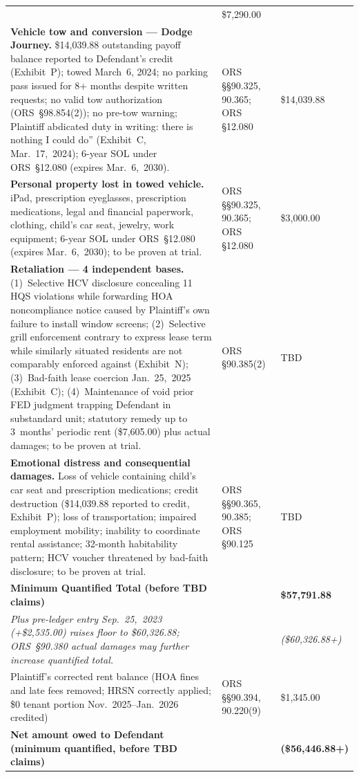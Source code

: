 \documentclass[10pt,letterpaper,oneside]{extarticle}
\begin{document}
\begin{longtable}{p{3.3in} p{1.6in} p{.7in}}
	& \$7,290.00 \\[12pt]
	\textbf{Vehicle tow and conversion --- Dodge
		Journey.} \$14,039.88 outstanding payoff balance
	reported to Defendant's credit (Exhibit~P); towed
	March~6, 2024; no parking pass issued for 8+
	months despite written requests; no valid tow
	authorization (ORS~\S98.854(2)); no pre-tow
	warning; Plaintiff abdicated duty in writing:
	there is nothing I could do''
	(Exhibit~C, Mar.~17,~2024); 6-year SOL under
	ORS~\S12.080 (expires Mar.~6,~2030).
	& ORS \S\S90.325, 90.365; ORS \S12.080
	& \$14,039.88 \\[12pt]
	\textbf{Personal property lost in towed vehicle.}
	iPad, prescription eyeglasses, prescription
	medications, legal and financial paperwork,
	clothing, child's car seat, jewelry, work
	equipment; 6-year SOL under ORS~\S12.080
	(expires Mar.~6,~2030); to be proven at trial.
	& ORS \S\S90.325, 90.365; ORS \S12.080
	& \$3,000.00 \\[12pt]
	\textbf{Retaliation --- 4 independent bases.}
	(1)~Selective HCV disclosure concealing 11 HQS
	violations while forwarding HOA noncompliance
	notice caused by Plaintiff's own failure to
	install window screens;
	(2)~Selective grill enforcement contrary to
	express lease term while similarly situated
	residents are not comparably enforced against
	(Exhibit~N);
	(3)~Bad-faith lease coercion Jan.~25,~2025
	(Exhibit~C);
	(4)~Maintenance of void prior FED judgment
	trapping Defendant in substandard unit;
	statutory remedy up to 3~months' periodic rent
	(\$7,605.00) plus actual damages; to be proven
	at trial.
	& ORS \S90.385(2)
	& TBD \\[12pt]
	\textbf{Emotional distress and consequential
		damages.} Loss of vehicle containing child's car
	seat and prescription medications; credit
	destruction (\$14,039.88 reported to credit,
	Exhibit~P); loss of transportation; impaired
	employment mobility; inability to coordinate
	rental assistance; 32-month habitability pattern;
	HCV voucher threatened by bad-faith disclosure;
	to be proven at trial.
	& ORS \S\S90.365, 90.385; ORS \S90.125
	& TBD \\[12pt]
	\midrule
	\textbf{Minimum Quantified Total
		(before TBD claims)}
	& & \textbf{\$57,791.88} \\[6pt]
	\textit{Plus pre-ledger entry Sep.~25,~2023
		(+\$2,535.00) raises floor to \$60,326.88;
		ORS~\S90.380 actual damages may further increase
		quantified total.}
	& & \textit{(\$60,326.88+)} \\[6pt]
	Plaintiff's corrected rent balance (HOA fines
	and late fees removed; HRSN correctly applied;
	\$0 tenant portion Nov.~2025--Jan.~2026 credited)
	& ORS \S\S90.394, 90.220(9)
	& \$1,345.00 \\[6pt]
	\midrule
	\textbf{Net amount owed to Defendant
		(minimum quantified, before TBD claims)}
	& & \textbf{(\$56,446.88+)} \\
	\bottomrule
\end{longtable}
\end{document}
